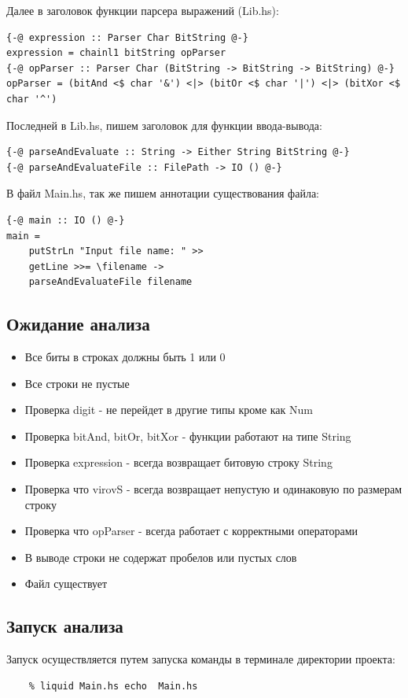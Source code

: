 \documentclass[areasetadvanced]{scrartcl}
\begin{document}
Далее в заголовок функции парсера выражений (Lib.hs):
\begin{lstlisting}[caption={Аннотации}, label=lst:main]
{-@ expression :: Parser Char BitString @-}
expression = chainl1 bitString opParser
{-@ opParser :: Parser Char (BitString -> BitString -> BitString) @-}
opParser = (bitAnd <$ char '&') <|> (bitOr <$ char '|') <|> (bitXor <$ char '^')
\end{lstlisting}
Последней в Lib.hs, пишем заголовок для функции ввода-вывода:
\begin{lstlisting}[caption={Аннотации}, label=lst:main]
{-@ parseAndEvaluate :: String -> Either String BitString @-}
{-@ parseAndEvaluateFile :: FilePath -> IO () @-}
\end{lstlisting}
В файл Main.hs, так же пишем аннотации существования файла:
\begin{lstlisting}[caption={Main.hs с введенными аннотациями}, label=lst:main]
{-@ main :: IO () @-}
main = 
    putStrLn "Input file name: " >>
    getLine >>= \filename ->
    parseAndEvaluateFile filename
\end{lstlisting}
\subsection{Ожидание анализа}
\begin{itemize}
    \item Все биты в строках должны быть 1 или 0
    \item Все строки не пустые 
    \item Проверка digit - не перейдет в другие типы кроме как Num
    \item Проверка bitAnd, bitOr, bitXor - функции работают на типе String
    \item Проверка expression - всегда возвращает битовую строку String
    \item Проверка что virovS - всегда возвращает непустую и одинаковую по размерам строку
    \item Проверка что opParser - всегда работает с корректными операторами
    \item В выводе строки не содержат пробелов или пустых слов
    \item Файл существует 
\end{itemize}
\subsection{Запуск анализа}
Запуск осуществляется путем запуска команды в терминале директории проекта:
\begin{lstlisting}[caption={команды}, label=lst:main]
    % liquid Lib.hs  echo  Lib.hs
    % liquid Main.hs echo  Main.hs
\end{lstlisting}
\newpage
\end{document}
